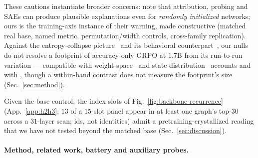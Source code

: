 \documentclass{article}
\begin{document}
These cautions instantiate broader concerns: \citet{dead_salmons2026} note that attribution, probing and SAEs can produce plausible explanations even for \emph{randomly initialized} networks; ours is the training-axis instance of their warning, made constructive (matched real base, named metric, permutation/width controls, cross-family replication). Against the entropy-collapse picture~\citep{cui2025entropy_mechanism} and its behavioral counterpart~\citep{yue2025,wang2025}, our nulls do not resolve a footprint of accuracy-only GRPO at $1.7$B from its run-to-run variation --- compatible with weight-space~\citep{relex_rank1_rlvr2026} and state-distribution~\citep{posttraining_states_not_tokens2026} accounts and with \citet{venhoff2026base_reason}, though a within-band contrast does not measure the footprint's size (Sec.~\ref{sec:method}).

Given the base control, the index slots of Fig.~\ref{fig:backbone-recurrence} (App.~\ref{app:h2h3}; $13$ of a $15$-slot panel appear in at least one graph's top-$30$ across a $31$-layer scan; ids, not identities) admit a pretraining-crystallized reading that we have not tested beyond the matched base (Sec.~\ref{sec:discussion}).

\paragraph{Method, related work, battery and auxiliary probes.}
\end{document}
